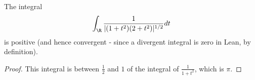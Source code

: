 \begin{lemma}[integralPosAux]
\label{integralPosAux}
\leanok
The integral
  $$\int_\R\frac{1}{|(1+t^2)(2+t^2)|^{1/2}}dt$$
  is positive (and hence convergent - since a divergent integral is zero in Lean, by
  definition).
\end{lemma}
\begin{proof}
\leanok
This integral is between $\frac{1}{2}$ and $1$ of the integral of $\frac{1}{1+t^2}$,
  which is $\pi$.
\end{proof}
